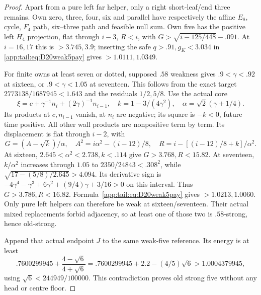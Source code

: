 \documentclass[11pt]{article}
\theoremstyle{definition}
\theoremstyle{remark}
\begin{document}
\begin{proof}
Apart from a pure left far helper, only a right short-leaf/end
three remains. Own zero, three, four, six and parallel have
respectively the affine $E_8$, cycle, $F_4$ path, six--three
path and feasible null sum. Own five has the positive left
$H_4$ projection, flat through $i-3$, $R<i$, with
$G>\sqrt{i-125/448}-.091$.
At $i=16,17$ this is $>3.745,3.9$; inserting the safe
$q>.91,g_K<3.034$ in \eqref{app:tail:eq:D20weak5pay} gives
$>1.0111,1.0349$.

For finite owns at least seven or dotted, supposed $.58$
weakness gives $.9<\gamma<.92$ at sixteen, or
$.9<\gamma<1.05$ at seventeen. This follows from the exact
target $2773138/1687945<1.643$ and the residuals $1/2,5/8$.
Use the actual core
\[
 \xi=c+\gamma^{-1}n_i+(2\gamma)^{-1}n_{i-1},\quad
 k=1-3/(4\gamma^2),\quad \alpha=\sqrt2(\gamma+1/4).
\]
Its products at $c,n_{i-1}$ vanish, at $n_i$ are negative;
its square is $-k<0$, future time positive. All other wall
products are nonpositive term by term. Its displacement is
flat through $i-2$, with
\[
 G=(A-\sqrt k)/\alpha,
 \quad A^2=i\alpha^2-(i-12)/8,
 \quad R=i-[(i-12)/8+k]/\alpha^2.
\]
At sixteen, $2.645<\alpha^2<2.738,k<.114$ give
$G>3.768,R<15.82$. At seventeen,
$k/\alpha^2$ increases through $1.05$ to
$2350/24843<.308^2$, while
$\sqrt{17-(5/8)/2.645}>4.094$.
Its derivative sign is
$-4\gamma^4-\gamma^3+6\gamma^2+(9/4)\gamma+3/16>0$
on this interval. Thus $G>3.786,R<16.82$.
Formula~\eqref{app:tail:eq:D20weak5pay} gives $>1.0213,1.0060$.
Only pure left helpers can therefore be weak at sixteen/seventeen.
Their actual mixed replacements forbid adjacency, so at least one
of those two is $.58$-strong, hence old-strong.

Append that actual endpoint $J$ to the same weak-five reference.
Its energy is at least
\[
 .7600299945+{\frac{4-\sqrt6}{4+\sqrt6}}
 =.7600299945+2.2-(4/5)\sqrt6
 >1.0004379945,
\]
using $\sqrt6<244949/100000$. This contradiction proves old
strong five without any head or centre floor.
\end{proof}
\end{document}
